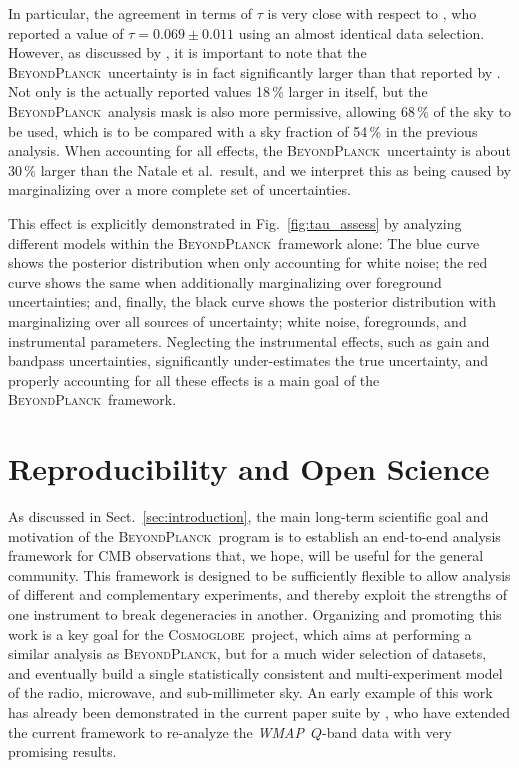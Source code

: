\documentclass[onecolumn]{aa}
\def\WMAP{\emph{WMAP}}
\newcommand{\BP}{\textsc{BeyondPlanck}}
\newcommand{\cosmoglobe}{\textsc{Cosmoglobe}}
\begin{document}
In particular, the agreement in terms of $\tau$ is very close with
respect to \citet{natale:2020}, who reported a value of
$\tau=0.069\pm0.011$ using an almost identical data
selection. However, as discussed by \citet{bp12}, it is important to
note that the \BP\ uncertainty is in fact significantly larger than
that reported by \citet{natale:2020}. Not only is the actually
reported values 18\,\% larger in itself, but the \BP\ analysis mask is
also more permissive, allowing 68\,\% of the sky to be used, which is
to be compared with a sky fraction of 54\,\% in the previous
analysis. When accounting for all effects, the \BP\ uncertainty is
about 30\,\% larger than the Natale et al.\ result, and we interpret
this as being caused by marginalizing over a more complete set of
uncertainties.

This effect is explicitly demonstrated in Fig.~\ref{fig:tau_assess} by
analyzing different models within the \BP\ framework alone: The blue
curve shows the posterior distribution when only accounting for white
noise; the red curve shows the same when additionally marginalizing
over foreground uncertainties; and, finally, the black curve shows the
posterior distribution with marginalizing over all sources of
uncertainty; white noise, foregrounds, and instrumental
parameters. Neglecting the instrumental effects, such as gain and
bandpass uncertainties, significantly under-estimates the true
uncertainty, and properly accounting for all these effects is a main
goal of the \BP\ framework.




\section{Reproducibility and Open Science}
\label{sec:software}


As discussed in Sect.~\ref{sec:introduction}, the main long-term
scientific goal and motivation of the \BP\ program is to establish an
end-to-end analysis framework for CMB observations that, we hope, will
be useful for the general community. This framework is designed to be
sufficiently flexible to allow analysis of different and complementary
experiments, and thereby exploit the strengths of one instrument to
break degeneracies in another. Organizing and promoting this work is a
key goal for the \cosmoglobe\ project, which aims at performing a
similar analysis as \BP, but for a much wider selection of datasets,
and eventually build a single statistically consistent and
multi-experiment model of the radio, microwave, and sub-millimeter
sky. An early example of this work has already been demonstrated in
the current paper suite by \citet{bp17}, who have extended the current
framework to re-analyze the \WMAP\ $Q$-band data with very promising
results.
\end{document}
